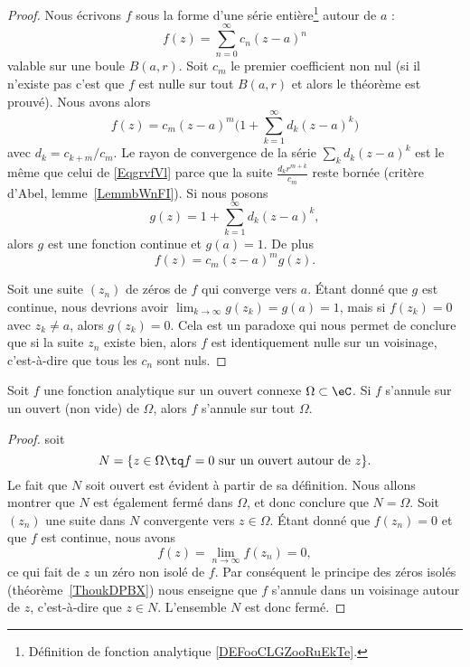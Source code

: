\begin{proof}
	Nous écrivons \( f\) sous la forme d'une série entière\footnote{Définition de fonction analytique \ref{DEFooCLGZooRuEkTe}.} autour de \( a\) :
	\begin{equation}        \label{EqgrvfVl}
		f(z)=\sum_{n=0}^{\infty}c_n(z-a)^n
	\end{equation}
	valable sur une boule \( B(a,r)\). Soit \( c_m\) le premier coefficient non nul (si il n'existe pas c'est que \( f\) est nulle sur tout \( B(a,r) \) et alors le théorème est prouvé). Nous avons alors
	\begin{equation}
		f(z)=c_m(z-a)^m\big( 1+\sum_{k=1}^{\infty}d_k(z-a)^k \big)
	\end{equation}
	avec \( d_k=c_{k+m}/c_m\). Le rayon de convergence de la série \( \sum_k d_k(z-a)^k\) est le même que celui de \eqref{EqgrvfVl} parce que la suite \( \frac{ d_kr^{m+k} }{ c_m }\) reste bornée (critère d'Abel, lemme~\ref{LemmbWnFI}). Si nous posons
	\begin{equation}
		g(z)=1+\sum_{k=1}^{\infty}d_k(z-a)^k,
	\end{equation}
	alors \( g\) est une fonction continue et \( g(a)=1\). De plus
	\begin{equation}
		f(z)=c_m(z-a)^mg(z).
	\end{equation}

	Soit une suite \( (z_n)\) de zéros de \( f\) qui converge vers \( a\). Étant donné que \( g\) est continue, nous devrions avoir \( \lim_{k\to\infty}g(z_k)=g(a)=1\), mais si \( f(z_k)=0\) avec \( z_k\neq a\), alors \( g(z_k)=0\). Cela est un paradoxe qui nous permet de conclure que si la suite \( z_n\) existe bien, alors \( f\) est identiquement nulle sur un voisinage, c'est-à-dire que tous les \( c_n\) sont nuls.
\end{proof}

\begin{corollary}       \label{CORooFBXXooZyfUQi}
	Soit \( f\) une fonction analytique sur un ouvert connexe \( \Omega\subset \eC\). Si \( f\) s'annule sur un ouvert (non vide) de \( \Omega\), alors \( f\) s'annule sur tout \( \Omega\).
\end{corollary}

\begin{proof}
	soit
	\begin{equation}
		N=\{ z\in \Omega\tq f=0\text{ sur un ouvert autour de }z \}.
	\end{equation}
	Le fait que \( N\) soit ouvert est évident à partir de sa définition. Nous allons montrer que \( N\) est également fermé dans \( \Omega\), et donc conclure que \( N=\Omega\). Soit \( (z_n)\) une suite dans \( N\) convergente vers \( z\in \Omega\). Étant donné que \( f(z_n)=0\) et que \( f\) est continue, nous avons
	\begin{equation}
		f(z)=\lim_{n\to \infty} f(z_n)=0,
	\end{equation}
	ce qui fait de \( z\) un zéro non isolé de \( f\). Par conséquent le principe des zéros isolés (théorème~\ref{ThoukDPBX}) nous enseigne que \( f\) s'annule dans un voisinage autour de \( z\), c'est-à-dire que \( z\in N\). L'ensemble \( N\) est donc fermé.
\end{proof}


